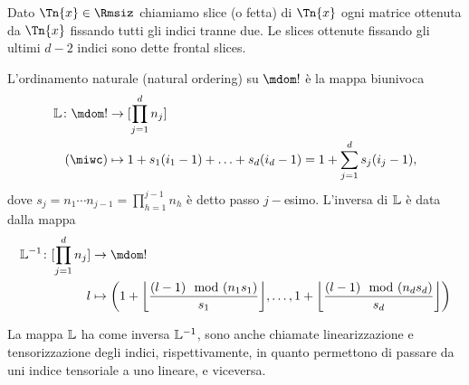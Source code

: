 \begin{definition}
  Dato $ \Tn{x} \in \Rmsiz $ chiamiamo slice (o fetta) di $ \Tn{x} $ ogni matrice ottenuta da $
  \Tn{x} $ fissando tutti gli indici tranne due. Le slices ottenute fissando gli ultimi $ d-2 $ indici sono dette frontal slices.
\end{definition}



\begin{definition}
  L'ordinamento naturale (natural ordering) su $ \mdom! $ è la mappa biunivoca
\begin{equation*}
  \begin{aligned}
    \L \colon \mdom! &\to [\prod_{j=1}^d n_j]\\
    (\miwc) &\mapsto 1 + s_1 (i_1-1) + \ldots + s_d(i_d-1) = 1 + \sum_{j=1}^d s_j(i_j - 1),
  \end{aligned}
\end{equation*}
dove $ s_j = n_1 \cdots n_{j-1} = \prod_{h=1}^{j-1}n_h $ è detto passo $ j- $esimo.
L'inversa di $ \mathbb{L} $ è data dalla mappa
\begin{equation*}
  \begin{aligned}
    \L^{-1} \colon [\prod_{j=1}^d n_j] &\to \mdom!\\
    l &\mapsto \left(1 + \left\lfloor \frac{ (l-1)\mod(n_1s_1)}{s_1}\right\rfloor, \ldots, 1 +
    \left\lfloor \frac{ (l-1)\mod(n_ds_d)}{s_d} \right\rfloor \right)
  \end{aligned}
\end{equation*}
\end{definition}
\begin{remark}
  La mappa $ \mathbb{L} $ ha come inversa $ \mathbb{L}^{-1} $, sono anche chiamate linearizzazione e tensorizzazione
  degli indici, rispettivamente, in quanto permettono di passare da uni indice tensoriale a uno
  lineare, e viceversa.
\end{remark}
